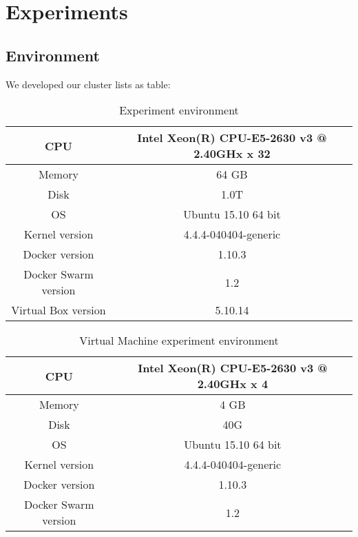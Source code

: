 \chapter{Experiments}
\label{chap:experiments}
\section{Environment}
We developed our cluster lists as table:

\begin{table}[h]
\label{talbe:Host}
\begin{tabular}{|c|c|} \hline
CPU & Intel Xeon(R) CPU-E5-2630 v3 @ 2.40GHx x 32 \\ \hline
Memory & 64 GB \\ \hline
Disk & 1.0T \\ \hline
OS & Ubuntu 15.10 64 bit \\ \hline
Kernel version & 4.4.4-040404-generic \\ \hline
Docker version & 1.10.3 \\ \hline
Docker Swarm version & 1.2 \\ \hline
Virtual Box version & 5.10.14 \\ \hline
\end{tabular}
\caption{Experiment environment}
\end{table}

\begin{table}[h]
\label{talbe:Virtual Machine}
\begin{tabular}{|c|c|} \hline
CPU & Intel Xeon(R) CPU-E5-2630 v3 @ 2.40GHx x 4 \\ \hline
Memory & 4 GB \\ \hline
Disk & 40G \\ \hline
OS & Ubuntu 15.10 64 bit \\ \hline
Kernel version & 4.4.4-040404-generic \\ \hline
Docker version & 1.10.3 \\ \hline
Docker Swarm version & 1.2 \\ \hline
\end{tabular}
\caption{Virtual Machine experiment environment}
\end{table}